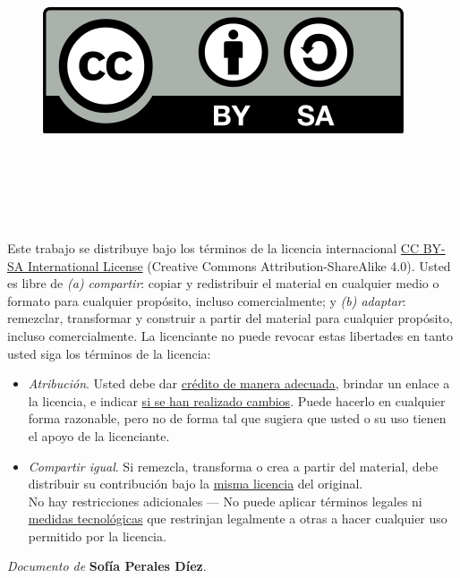
\cleardoublepage

\begin{flushright}
\begin{figure}
 \ \ \ \ \includegraphics[width=0.25\linewidth,right]{figs/by-sa.png}
 \label{fig:cc} 
 \end{figure}
\end{flushright}

\

\

\

\noindent
Este trabajo se distribuye bajo los términos de la licencia internacional \href{http://creativecommons.org/licenses/by-sa/4.0/}{CC BY-SA International License} (Creative Commons Attribution-ShareAlike 4.0). Usted es libre de \textit{(a) compartir}: copiar y redistribuir el material en cualquier medio o formato para cualquier propósito, incluso comercialmente; y \textit{(b) adaptar}: remezclar, transformar y construir a partir del material para cualquier propósito, incluso comercialmente. La licenciante no puede revocar estas libertades en tanto usted siga los términos de la licencia:

\begin{itemize}
\item \textit{Atribución}. Usted debe dar \href{https://creativecommons.org/licenses/by-sa/4.0/deed.es#ref-appropriate-credit}{crédito de manera adecuada}, brindar un enlace a la licencia, e indicar \href{https://creativecommons.org/licenses/by-sa/4.0/deed.es#ref-indicate-changes}{si se han realizado cambios}. Puede hacerlo en cualquier forma razonable, pero no de forma tal que sugiera que usted o su uso tienen el apoyo de la licenciante.
\item \textit{Compartir igual}. Si remezcla, transforma o crea a partir del material, debe distribuir su contribución bajo la \href{https://creativecommons.org/licenses/by-sa/4.0/deed.es#ref-same-license}{misma licencia} del original.\\
No hay restricciones adicionales — No puede aplicar términos legales ni \href{https://creativecommons.org/licenses/by-sa/4.0/deed.es#ref-technological-measures}{medidas tecnológicas} que restrinjan legalmente a otras a hacer cualquier uso permitido por la licencia.
\end{itemize}

\begin{flushright}
		\vspace{7.0 cm}
		\emph{Documento de} \textbf{Sofía Perales Díez}. %
\end{flushright}

